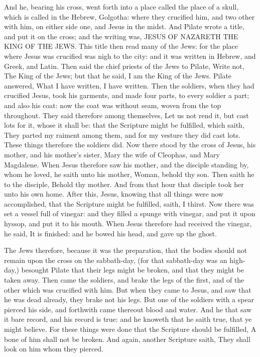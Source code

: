 And he, bearing his cross, went forth into a place called the place of a skull, which is called in the Hebrew, Golgotha: where they crucified him, and two other with him, on either side one, and Jesus in the midst. And Pilate wrote a title, and put it on the cross; and the writing was, JESUS OF NAZARETH THE KING OF THE JEWS. This title then read many of the Jews: for the place where Jesus was crucified was nigh to the city: and it was written in Hebrew, and Greek, and Latin. Then said the chief priests of the Jews to Pilate, Write not, The King of the Jews; but that he said, I am the King of the Jews. Pilate answered, What I have written, I have written. Then the soldiers, when they had crucified Jesus, took his garments, and made four parts, to every soldier a part; and also his coat: now the coat was without seam, woven from the top throughout. They said therefore among themselves, Let us not rend it, but cast lots for it, whose it shall be: that the Scripture might be fulfilled, which saith, They parted my raiment among them, and for my vesture they did cast lots. These things therefore the soldiers did. Now there stood by the cross of Jesus, his mother, and his mother's sister, Mary the wife of Cleophas, and Mary Magdalene. When Jesus therefore saw his mother, and the disciple standing by, whom he loved, he saith unto his mother, Woman, behold thy son. Then saith he to the disciple, Behold thy mother. And from that hour that disciple took her unto his own home. After this, Jesus, knowing that all things were now accomplished, that the Scripture might be fulfilled, saith, I thirst. Now there was set a vessel full of vinegar: and they filled a spunge with vinegar, and put it upon hyssop, and put it to his mouth. When Jesus therefore had received the vinegar, he said, It is finished: and he bowed his head, and gave up the ghost.

The Jews therefore, because it was the preparation, that the bodies should not remain upon the cross on the sabbath-day, (for that sabbath-day was an high-day,) besought Pilate that their legs might be broken, and that they might be taken away. Then came the soldiers, and brake the legs of the first, and of the other which was crucified with him. But when they came to Jesus, and saw that he was dead already, they brake not his legs. But one of the soldiers with a spear pierced his side, and forthwith came thereout blood and water. And he that saw it bare record, and his record is true: and he knoweth that he saith true, that ye might believe. For these things were done that the Scripture should be fulfilled, A bone of him shall not be broken. And again, another Scripture saith, They shall look on him whom they pierced.

